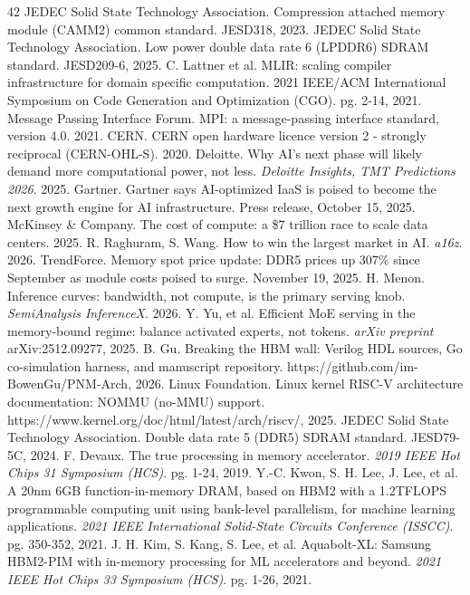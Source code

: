\documentclass[10pt,twocolumn]{article}
\begin{document}
\begin{thebibliography}{42}
 JEDEC Solid State Technology Association. Compression attached memory module (CAMM2) common standard. JESD318, 2023.
 JEDEC Solid State Technology Association. Low power double data rate 6 (LPDDR6) SDRAM standard. JESD209-6, 2025.
 C. Lattner et al. MLIR: scaling compiler infrastructure for domain specific computation. 2021 IEEE/ACM International Symposium on Code Generation and Optimization (CGO). pg. 2-14, 2021.
 Message Passing Interface Forum. MPI: a message-passing interface standard, version 4.0. 2021.
 CERN. CERN open hardware licence version 2 - strongly reciprocal (CERN-OHL-S). 2020.
 Deloitte. Why AI's next phase will likely demand more computational power, not less. \textit{Deloitte Insights, TMT Predictions 2026}. 2025.
 Gartner. Gartner says AI-optimized IaaS is poised to become the next growth engine for AI infrastructure. Press release, October 15, 2025.
 McKinsey \& Company. The cost of compute: a \$7 trillion race to scale data centers. 2025.
 R. Raghuram, S. Wang. How to win the largest market in AI. \textit{a16z}. 2026.
 TrendForce. Memory spot price update: DDR5 prices up 307\% since September as module costs poised to surge. November 19, 2025.
 H. Menon. Inference curves: bandwidth, not compute, is the primary serving knob. \textit{SemiAnalysis InferenceX}. 2026.
 Y. Yu, et al. Efficient MoE serving in the memory-bound regime: balance activated experts, not tokens. \textit{arXiv preprint} arXiv:2512.09277, 2025.
 B. Gu. Breaking the HBM wall: Verilog HDL sources, Go co-simulation harness, and manuscript repository. https://github.com/im-BowenGu/PNM-Arch, 2026.
 Linux Foundation. Linux kernel RISC-V architecture documentation: NOMMU (no-MMU) support. https://www.kernel.org/doc/html/latest/arch/riscv/, 2025.
 JEDEC Solid State Technology Association. Double data rate 5 (DDR5) SDRAM standard. JESD79-5C, 2024.
 F. Devaux. The true processing in memory accelerator. \textit{2019 IEEE Hot Chips 31 Symposium (HCS)}. pg. 1-24, 2019.
 Y.-C. Kwon, S. H. Lee, J. Lee, et al. A 20nm 6GB function-in-memory DRAM, based on HBM2 with a 1.2TFLOPS programmable computing unit using bank-level parallelism, for machine learning applications. \textit{2021 IEEE International Solid-State Circuits Conference (ISSCC)}. pg. 350-352, 2021.
 J. H. Kim, S. Kang, S. Lee, et al. Aquabolt-XL: Samsung HBM2-PIM with in-memory processing for ML accelerators and beyond. \textit{2021 IEEE Hot Chips 33 Symposium (HCS)}. pg. 1-26, 2021.

\end{thebibliography}
\end{document}
